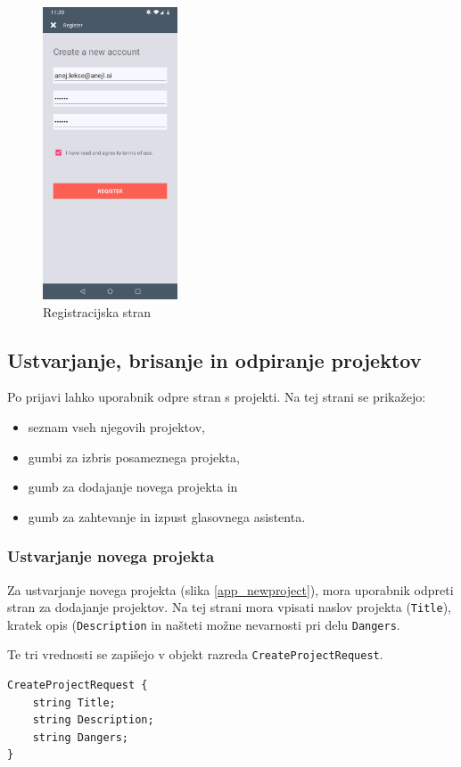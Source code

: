 \documentclass[a4paper, 12pt]{book}
\begin{document}
\begin{figure}[H]
\begin{center}
\includegraphics[width=4cm]{app_register}
\end{center}
	\caption{Registracijska stran}
\label{app_register}
\end{figure}

\subsection{Ustvarjanje, brisanje in odpiranje projektov}

Po prijavi lahko uporabnik odpre stran s projekti.
Na tej strani se prikažejo:
\begin{itemize}
	\item seznam vseh njegovih projektov, 
	\item gumbi za izbris posameznega projekta,
	\item gumb za dodajanje novega projekta in
	\item gumb za zahtevanje in izpust glasovnega asistenta.
\end{itemize}

\subsubsection{Ustvarjanje novega projekta}

Za ustvarjanje novega projekta (slika \ref{app_newproject}), mora uporabnik odpreti stran za dodajanje projektov.
Na tej strani mora vpisati naslov projekta (\texttt{Title}), kratek opis (\texttt{Description} in našteti možne nevarnosti pri delu \texttt{Dangers}.

Te tri vrednosti se zapišejo v objekt razreda \texttt{CreateProjectRequest}.
\begin{Verbatim}[commandchars=+\[\]]
CreateProjectRequest {
    string Title;
    string Description;
    string Dangers;
}
\end{Verbatim}
\end{document}
